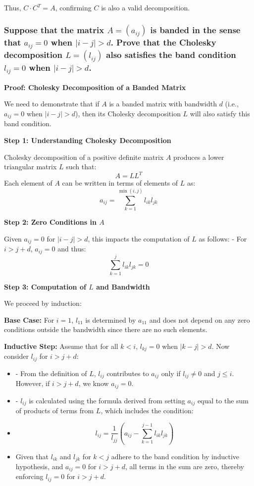 \documentclass[8pt]{article}
\begin{document}
Thus, \(C \cdot C^T = A\), confirming \(C\) is also a valid decomposition.

\subsubsection*{Suppose that the matrix \( A = (a_{ij}) \) is banded in the sense that \( a_{ij} = 0 \) when \( |i - j| > d \). Prove that the Cholesky decomposition \( L = (l_{ij}) \) also satisfies the band condition \( l_{ij} = 0 \) when \( |i - j| > d \).}

\textbf{Proof: Cholesky Decomposition of a Banded Matrix}

We need to demonstrate that if \(A\) is a banded matrix with bandwidth \(d\) (i.e., \(a_{ij} = 0\) when \(|i - j| > d\)), then its Cholesky decomposition \(L\) will also satisfy this band condition.

\textbf{Step 1: Understanding Cholesky Decomposition}

Cholesky decomposition of a positive definite matrix \(A\) produces a lower triangular matrix \(L\) such that:
\[ A = LL^T \]
Each element of \(A\) can be written in terms of elements of \(L\) as:
\[ a_{ij} = \sum_{k=1}^{\min(i,j)} l_{ik}l_{jk} \]

\textbf{Step 2: Zero Conditions in \(A\)}

Given \(a_{ij} = 0\) for \(|i - j| > d\), this impacts the computation of \(L\) as follows:
- For \(i > j + d\), \(a_{ij} = 0\) and thus:
\[ \sum_{k=1}^j l_{ik}l_{jk} = 0 \]

\textbf{Step 3: Computation of \(L\) and Bandwidth}

We proceed by induction:

\textbf{Base Case:} For \(i = 1\), \(l_{11}\) is determined by \(a_{11}\) and does not depend on any zero conditions outside the bandwidth since there are no such elements.

\textbf{Inductive Step: }Assume that for all \(k < i\), \(l_{kj} = 0\) when \(|k - j| > d\). Now consider \(l_{ij}\) for \(i > j + d\):
  \begin{itemize}
      \item - From the definition of \(L\), \(l_{ij}\) contributes to \(a_{ij}\) only if \(l_{ij} \neq 0\) and \(j \leq i\). However, if \(i > j + d\), we know \(a_{ij} = 0\).
      \item - \(l_{ij}\) is calculated using the formula derived from setting \(a_{ij}\) equal to the sum of products of terms from \(L\), which includes the condition:
      \item \[ l_{ij} = \frac{1}{l_{jj}} \left(a_{ij} - \sum_{k=1}^{j-1} l_{ik}l_{jk}\right) \]
      \item Given that \(l_{ik}\) and \(l_{jk}\) for \(k < j\) adhere to the band condition by inductive hypothesis, and \(a_{ij} = 0\) for \(i > j + d\), all terms in the sum are zero, thereby enforcing \(l_{ij} = 0\) for \(i > j + d\).
  \end{itemize}
\end{document}
